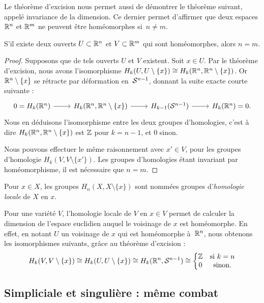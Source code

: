 Le théorème d'excision nous permet aussi de démontrer le théorème suivant, appelé invariance de la dimension. Ce dernier permet d'affirmer que deux espaces $\mathbb{R}^n$ et $\mathbb{R}^m$ ne peuvent être homéomorphes si~$n\neq m$.

\begin{theorem}
S'il existe deux ouverts $U\subset\mathbb{R}^n$ et $V\subset\mathbb{R}^m$ qui sont homéomorphes, alors $n=m$.
\end{theorem}
\begin{proof}
Supposons que de tels ouverts $U$ et $V$ existent. Soit $x\in U$. Par le théorème d'excision, nous avons l'isomorphisme ${H_k(U,U\setminus\{x\})\cong H_k(\mathbb{R}^n,\mathbb{R}^n\setminus\{x\})}$. Or $\mathbb{R}^n\setminus\{x\}$ se rétracte par déformation en~$\mathcal{S}^{n-1}$, donnant la suite exacte courte suivante : \[\begin{tikzcd}
0=H_k(\bb{R}^n)\arrow[r]&H_k(\bb{R}^n,\bb{R}^n\setminus\{x\})\arrow[r] &H_{k-1}(\s{n-1})\arrow[r]&H_k(\bb{R}^n)=0.
\end{tikzcd}\] Nous en déduisons l'isomorphisme entre les deux groupes d'homologies, c'est à dire $H_k(\mathbb{R}^n,\mathbb{R}^n\setminus\{x\})$ est $\mathbb{Z}$ pour $k=n-1$, et 0 sinon.

Nous pouvons effectuer le même raisonnement avec $x'\in V$, pour les groupes d'homologie $H_k(V,V\setminus\{x'\})$. Les groupes d'homologies étant invariant par homéomorphisme, il est nécessaire que $n=m$.
\end{proof}

Pour $x\in X$, les groupes $H_n(X,X\setminus\{x\})$ sont nommées groupes d'\emph{homologie locale} de $X$ en $x$.

Pour une variété $V$, l'homologie locale de $V$ en $x\in V$ permet de calculer la dimension de l'espace euclidien auquel le voisinage de $x$ est homéomorphe. En effet, en notant $U$ un voisinage de $x$ qui est homéomorphe à~$\mathbb{R}^n$, nous obtenons les isomorphismes suivants, grâce au théorème d'excision : \[H_k(V,V\setminus\{x\})\cong H_k(U,U\setminus\{x\})\cong H_k(\mathbb{R}^n,\mathcal{S}^{n-1})\cong\left\{\begin{matrix}
\mathbb{Z}&\text{si } k=n\\
0&\text{sinon}.
\end{matrix}\right.\]

\subsection{Simpliciale et singulière : même combat}

